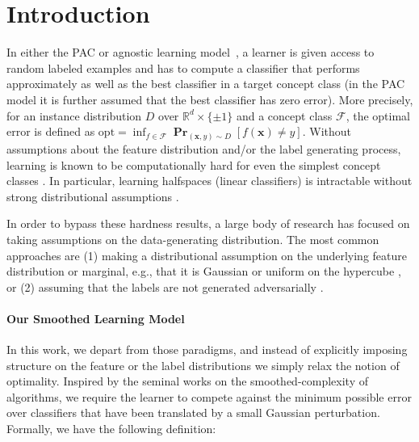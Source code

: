 \documentclass[10pt,a4paper]{article}
\renewcommand\vec[1]{\mathbf{#1}}
\DeclareMathOperator*{\pr}{\mathbf{Pr}}
\newcommand{\R}{\mathbb{R}}
\newcommand{\opt}{\mathrm{opt}}
\newcommand{\1}{\Ind}
\newcommand{\x}{\vec x}
\begin{document}
\section{Introduction}

In either the PAC or agnostic learning model~\cite{val84,Haussler:92,KSS:94}, a learner is given access to random labeled examples and has to compute a classifier that performs approximately as well as the best classifier in a target concept class (in the PAC model it is further assumed that the best classifier has zero error).  More precisely, for an instance distribution $D$ over 
$\R^d \times \{ \pm 1\}$ and a concept class $\mathcal F$, the optimal error is 
defined as $\opt = \inf_{f \in \mathcal F} \pr_{(\x, y) \sim D}[f(\x) \neq y]$.
Without assumptions about the feature distribution and/or the label generating process, learning is known to be computationally hard for even the simplest concept classes \cite{Khar1993,  GR:06,DBLP:journals/toc/Dachman-SoledLMSWW09, DBLP:journals/jcss/KhotS11, DBLP:journals/siamcomp/FeldmanGRW12,klivans2009cryptographic,DOSW:11, FLS:11colt, DanielyV21}. In particular, learning halfspaces (linear classifiers) is intractable without strong distributional assumptions \cite{KKMS:05,GR:06, Feldman:06, Daniely16}.

In order to bypass these hardness results, a large body of research has focused on taking assumptions on the data-generating distribution. 
The most common approaches are (1) making a distributional assumption on the underlying feature distribution or marginal, e.g., that it is Gaussian or uniform on the hypercube \cite{LMN:93,Long:03, KKMS:05,KOS:08, GKK:08,kalai2009learning,ABL17,DKKTZ21}, or (2) assuming that the labels are not generated adversarially  
\cite{AwasthiBHU15,AwasthiBHZ16,DGT19,DKTZ20,CKMY20,ZSA20,DKKTZ22,daniely2023computational,daniely2023most}.


\paragraph{Our Smoothed Learning Model} 
In this work, we depart from those paradigms, and instead of explicitly imposing structure 
on the feature or the label distributions we simply relax the notion of optimality.  Inspired by the seminal works \cite{spielman2004smoothed,spielman2005smoothed} on the 
smoothed-complexity of algorithms,
we require the learner to compete against
the minimum possible error over classifiers that have been translated by a small Gaussian perturbation. 
 Formally, we have the following definition:
 
\end{document}

